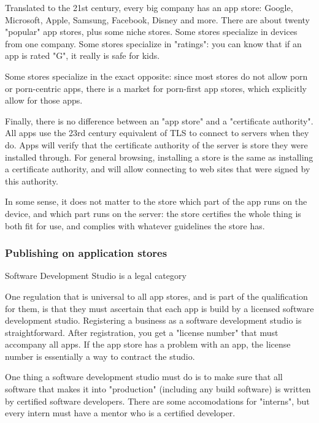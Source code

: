 Translated to the 21st century,
every big company has an app store:
Google, Microsoft, Apple, Samsung,
Facebook, Disney and more.
There are about twenty "popular" app stores,
plus some niche stores.
Some stores specialize in devices from one company.
Some stores specialize in "ratings":
you can know that if an app is rated "G",
it really is safe for kids.

Some stores specialize in the exact opposite:
since most stores do not allow porn or porn-centric apps,
there is a market for porn-first app stores,
which explicitly allow for those apps.

Finally,
there is no difference between an "app store"
and a "certificate authority".
All apps use the 23rd century equivalent of TLS to connect to servers
when they do.
Apps will verify that the certificate authority of the server
is store they were installed through.
For general browsing,
installing a store is the same as installing a certificate authority,
and will allow connecting to web sites that were signed by this
authority.

In some sense,
it does not matter to the store which part of the app runs on the device,
and which part runs on the server:
the store certifies the whole thing is both fit for use,
and complies with whatever guidelines the store has.

\begin{frame}[fragile]
\frametitle{Publishing on application stores}

Software Development Studio is a legal category

\end{frame}

One regulation that is universal to all app stores,
and is part of the qualification for them,
is that they must ascertain that each app is build
by a licensed software development studio.
Registering a business as a software development studio
is straightforward.
After registration, you get a "license number" that must accompany all apps.
If the app store has a problem with an app,
the license number is essentially a way to contract the studio.

One thing a software development studio must do is to make
sure that all software that makes it into "production"
(including any build software)
is written by certified software developers.
There are some accomodations for "interns",
but every intern must have a mentor who is a certified developer.

